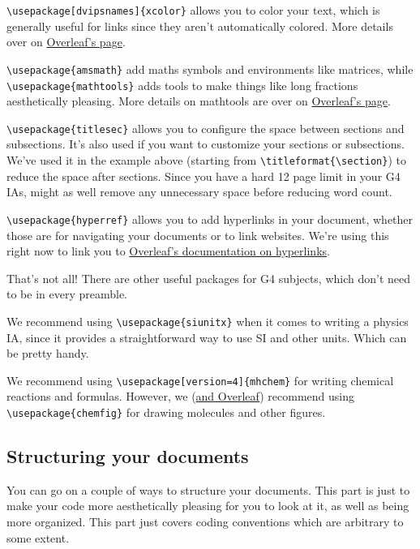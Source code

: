 \verb|\usepackage[dvipsnames]{xcolor}| allows you to color your text,
which is generally useful for links since they aren't automatically colored.
More details over on \href{https://www.overleaf.com/learn/latex/Using_colours_in_LaTeX}{Overleaf's page}.

\verb|\usepackage{amsmath}| add maths symbols and environments like matrices,
while\\ \verb|\usepackage{mathtools}| adds tools to make things like long fractions aesthetically pleasing.
More details on mathtools are over on
\href{https://www.overleaf.com/learn/latex/Articles/Mathtools_-_for_beautiful_math}{Overleaf's page}.

\verb|\usepackage{titlesec}| allows you to configure the space between sections and subsections.
It's also used if you want to customize your sections or subsections.
We've used it in the example above (starting from \verb|\titleformat{\section}|)
to reduce the space after sections.
Since you have a hard 12 page limit in your G4 IAs,
might as well remove any unnecessary space before reducing word count.

\verb|\usepackage{hyperref}| allows you to add hyperlinks in your document,
whether those are for navigating your documents or to link websites.
We're using this right now to link you to
\href{https://www.overleaf.com/learn/latex/Hyperlinks}{Overleaf's documentation on hyperlinks}.

That's not all! There are other useful packages for G4 subjects,
which don't need to be in every preamble.

We recommend using \verb|\usepackage{siunitx}| when it comes to writing a physics IA,
since it provides a straightforward way to use SI and other units.
Which can be pretty handy.

We recommend using \verb|\usepackage[version=4]{mhchem}| for writing chemical reactions and formulas.
However, we (\href{https://www.overleaf.com/learn/latex/Chemistry_formulae}{and Overleaf})
recommend using \verb|\usepackage{chemfig}| for drawing molecules and other figures.

\subsection{Structuring your documents}
You can go on a couple of ways to structure your documents.
This part is just to make your code more aesthetically pleasing for you to look at it,
as well as being more organized.
This part just covers coding conventions which are arbitrary to some extent.

